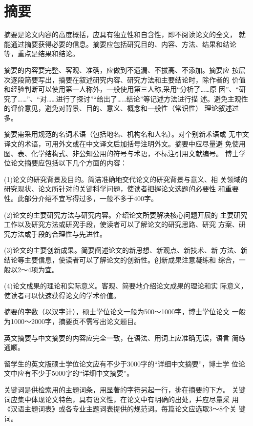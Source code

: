 \chapter*{摘要}
摘要是论文内容的高度概括，应具有独立性和自含性，即不阅读论文的全文，
就能通过摘要获得必要的信息。摘要应包括研究目的、内容、方法、结果和结论
等，重点是结果和结论。 

摘要的内容要完整、客观、准确，应做到不遗漏、不拔高、不添加。摘要应
按层次逐段简要写出，摘要在叙述研究内容、研究方法和主要结论时，除作者的
价值和经验判断可以使用第一人称外，一般使用第三人称,采用“分析了……原
因”、“研究了……”、“对……进行了探讨”“给出了……结论”等记述方法进行描
述。避免主观性的评价意见，避免对背景、目的、意义、概念和一般性（常识性）
理论叙述过多。 

摘要需采用规范的名词术语（包括地名、机构名和人名）。对个别新术语或
无中文译文的术语，可用外文或在中文译文后加括号注明外文。摘要中应尽量避
免使用图、表、化学结构式、非公知公用的符号与术语，不标注引用文献编号。 
博士学位论文摘要应包括以下几个方面的内容： 

(1)论文的研究背景及目的。简洁准确地交代论文的研究背景与意义、相
关领域的研究现状、论文所针对的关键科学问题，使读者把握论文选题的必要性
和重要性。此部分介绍不宜写得过多，一般不多于400字。 

(2)论文的主要研究方法与研究内容。介绍论文所要解决核心问题开展的
主要研究工作以及研究方法或研究手段，使读者可以了解论文的研究思路、研究
方案、研究方法或手段的合理性与先进性。 

(3)论文的主要创新成果。简要阐述论文的新思想、新观点、新技术、新
方法、新结论等主要信息，使读者可以了解论文的创新性。创新成果注意凝练和
综合，一般以2～4项为宜。 

(4)论文成果的理论和实际意义。客观、简要地介绍论文成果的理论和实
际意义，使读者可以快速获得论文的学术价值。 

摘要的字数（以汉字计），硕士学位论文一般为500～1000字，博士学位论文
一般为1000～2000字，摘要页不需写出论文题目。 

英文摘要与中文摘要的内容应完全一致，在语法、用词上应准确无误，语言
简练通顺。 

留学生的英文版硕士学位论文应有不少于3000字的“详细中文摘要”，博士学
位论文中应有不少于5000字的“详细中文摘要”。 

关键词是供检索用的主题词条，用显著的字符另起一行，排在摘要的下方。
关键词应集中体现论文特色，具有语义性，在论文中有明确的出处，并应尽量采
用《汉语主题词表》或各专业主题词表提供的规范词。每篇论文应选取3～8个关
键词。

